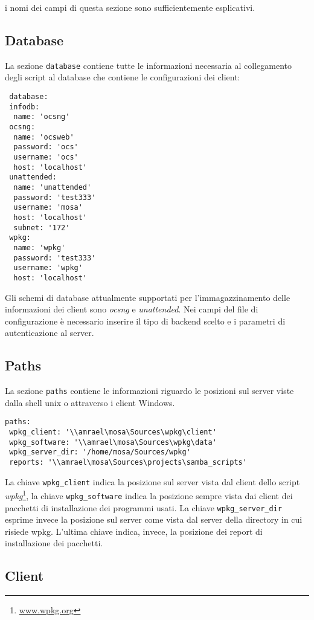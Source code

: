\documentclass[a4paper,10pt,oneside]{memoir}
\begin{document}
i nomi dei campi di questa sezione sono sufficientemente esplicativi.

\subsection*{Database}
La sezione \verb#database# contiene tutte le informazioni necessaria al collegamento degli script al database che contiene le configurazioni dei client:
\begin{verbatim}
 database:
 infodb:
  name: 'ocsng'
 ocsng:
  name: 'ocsweb'
  password: 'ocs'
  username: 'ocs'
  host: 'localhost'
 unattended:
  name: 'unattended'
  password: 'test333'
  username: 'mosa'
  host: 'localhost'
  subnet: '172' 
 wpkg:
  name: 'wpkg'
  password: 'test333'
  username: 'wpkg'
  host: 'localhost'
\end{verbatim}

Gli schemi di database attualmente supportati per l'immagazzinamento delle informazioni dei client sono \emph{ocsng} e \emph{unattended}. Nei campi del file di configurazione è necessario inserire il tipo di backend scelto e i parametri di autenticazione al server.


\subsection*{Paths}

La sezione \verb#paths# contiene le informazioni riguardo le posizioni sul server viste dalla shell unix o attraverso i client Windows. 
\begin{verbatim}
paths:
 wpkg_client: '\\amrael\mosa\Sources\wpkg\client'
 wpkg_software: '\\amrael\mosa\Sources\wpkg\data'
 wpkg_server_dir: '/home/mosa/Sources/wpkg'
 reports: '\\amrael\mosa\Sources\projects\samba_scripts' 
\end{verbatim}


La chiave \verb#wpkg_client# indica la posizione sul server vista dal client dello script \emph{wpkg}\footnote{\url{www.wpkg.org}}, la chiave \verb#wpkg_software# indica la posizione sempre vista dai client dei pacchetti di installazione dei programmi usati. La chiave \verb#wpkg_server_dir# esprime invece la posizione sul server come vista dal server della directory in cui risiede wpkg.  L'ultima chiave indica, invece, la posizione dei report di installazione dei pacchetti.

\subsection*{Client}
\end{document}
